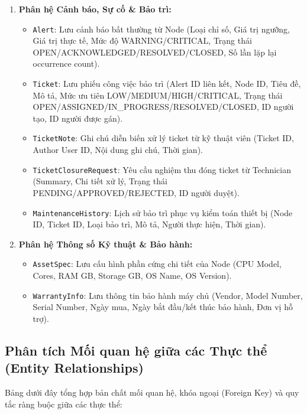 \begin{enumerate}
\begin{itemize}
        \item \texttt{DataCollectorAgent}: Lưu thông tin phần mềm Agent thu thập telemetry cài trên Node (Phiên bản, Trạng thái ACTIVE/INACTIVE, API Key Hash, Last Heartbeat).
        \item \texttt{TelemetryMetric}: CSDL chuỗi thời gian lưu dữ liệu đo đạc (CPU\%, RAM\%, Disk\%, Nhiệt độ, Network Rx/Tx, Timestamp).
    \end{itemize}
    \item \textbf{Phân hệ Cảnh báo, Sự cố \& Bảo trì:}
    \begin{itemize}
        \item \texttt{Alert}: Lưu cảnh báo bất thường từ Node (Loại chỉ số, Giá trị ngưỡng, Giá trị thực tế, Mức độ WARNING/CRITICAL, Trạng thái OPEN/ACKNOWLEDGED/RESOLVED/CLOSED, Số lần lặp lại occurrence count).
        \item \texttt{Ticket}: Lưu phiếu công việc bảo trì (Alert ID liên kết, Node ID, Tiêu đề, Mô tả, Mức ưu tiên LOW/MEDIUM/HIGH/CRITICAL, Trạng thái OPEN/ASSIGNED/IN\_PROGRESS/RESOLVED/CLOSED, ID người tạo, ID người được gán).
        \item \texttt{TicketNote}: Ghi chú diễn biến xử lý ticket từ kỹ thuật viên (Ticket ID, Author User ID, Nội dung ghi chú, Thời gian).
        \item \texttt{TicketClosureRequest}: Yêu cầu nghiệm thu đóng ticket từ Technician (Summary, Chi tiết xử lý, Trạng thái PENDING/APPROVED/REJECTED, ID người duyệt).
        \item \texttt{MaintenanceHistory}: Lịch sử bảo trì phục vụ kiểm toán thiết bị (Node ID, Ticket ID, Loại bảo trì, Mô tả, Người thực hiện, Thời gian).
    \end{itemize}
    \item \textbf{Phân hệ Thông số Kỹ thuật \& Bảo hành:}
    \begin{itemize}
        \item \texttt{AssetSpec}: Lưu cấu hình phần cứng chi tiết của Node (CPU Model, Cores, RAM GB, Storage GB, OS Name, OS Version).
        \item \texttt{WarrantyInfo}: Lưu thông tin bảo hành máy chủ (Vendor, Model Number, Serial Number, Ngày mua, Ngày bắt đầu/kết thúc bảo hành, Đơn vị hỗ trợ).
    \end{itemize}
\end{enumerate}

\subsection{Phân tích Mối quan hệ giữa các Thực thể (Entity Relationships)}
Bảng dưới đây tổng hợp bản chất mối quan hệ, khóa ngoại (Foreign Key) và quy tắc ràng buộc giữa các thực thể:

